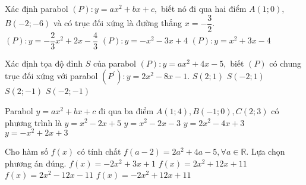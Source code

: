 \begin{ex}%
	Xác định parabol $(P)\colon  y=ax^2+bx+c,$ biết nó đi qua hai điểm $A(1;0),$  $B(-2;-6)$ và có trục đối xứng là đường thẳng $x =-\dfrac{3}{2}.$
	{$(P):  y = -\dfrac{2}{3}x^2+2x-\dfrac{4}{3} $}
	{$(P):  y =- x^2-3x +4 $}
	{\True $(P):   y =x^2+3x-4 $}
\end{ex}

\begin{ex}%
	Xác định tọa độ đỉnh $S$ của parabol $(P)\colon y=ax^2+4x-5,$ biết $(P)$ có chung trục đối xứng với parabol $(P^\prime): y=2x^2-8x-1$.
	\choice
	{$S(2;1)$}
	{$S(-2;1)$}
	{\True $S(2;-1)$}
	{$S(-2;-1)$}
\end{ex}
\begin{ex}%
	Parabol $y=ax^2+bx+c$ đi qua ba điểm $A(1;4), B(-1;0), C(2;3)$ có phương trình là
	\choice
	{$y=x^2-2x+5$}
	{$y=x^2-2x-3$}
	{$y=2x^2-4x+3$}
	{\True $y=-x^2+2x+3$} 
\end{ex}
\begin{ex}%
	Cho hàm số $f(x)$ có tính chất $f(a-2)=2a^2+4a-5, \forall a\in\mathbb{R}$. Lựa chọn phương án đúng.
	\choice
	{$f(x)=-2x^2+3x+1$}
	{\True $f(x)=2x^2+12x+11$}
	{$f(x)=2x^2-12x-11$}
	{$f(x)=-2x^2+12x+11$}
\end{ex}
